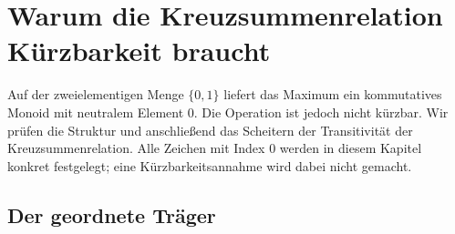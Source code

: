 \chapter{Warum die Kreuzsummenrelation Kürzbarkeit braucht}

Auf der zweielementigen Menge \(\{0,1\}\) liefert das Maximum ein
kommutatives Monoid mit neutralem Element \(0\). Die Operation ist jedoch
nicht kürzbar. Wir prüfen die Struktur und anschließend das Scheitern der
Transitivität der Kreuzsummenrelation. Alle Zeichen mit Index \(0\) werden
in diesem Kapitel konkret festgelegt; eine Kürzbarkeitsannahme wird dabei
nicht gemacht.

\par{}
\section{Der geordnete Träger}

\par{}
\hypertarget{differences.statement.FDMaxCarrier}{}

\par{}
\hypertarget{differences.statement.FDMaxNaturalConstants}{}
\begin{tabproofwide}
\end{tabproofwide}


\par{}
\hypertarget{differences.statement.FDMaxCarrierElements}{}
\begin{tabproofwide}
\end{tabproofwide}

